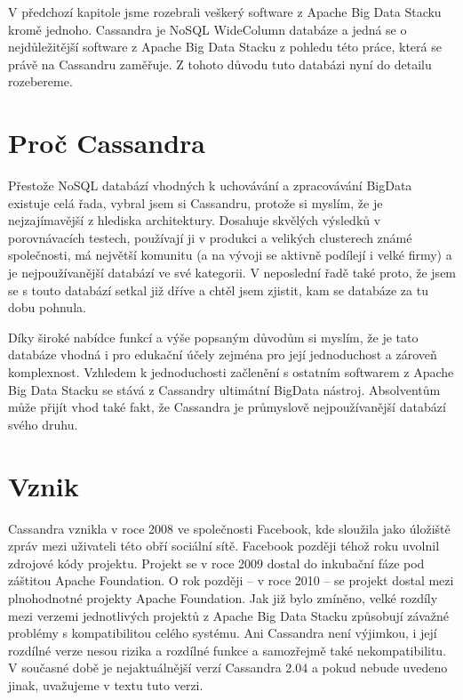 
V předchozí kapitole jsme rozebrali veškerý software z Apache Big Data Stacku kromě jednoho. Cassandra je NoSQL WideColumn databáze a jedná se o nejdůležitější software z Apache Big Data Stacku z pohledu této práce, která se právě na Cassandru zaměřuje. Z tohoto důvodu tuto databázi nyní do detailu rozebereme. 

\section{Proč Cassandra}
Přestože NoSQL databází vhodných k uchovávání a zpracovávání BigData existuje celá řada, vybral jsem si Cassandru, protože si myslím, že je nejzajímavější z hlediska architektury. Dosahuje skvělých výsledků v porovnávacích testech\cite{benchmark}, používají ji v produkci a velikých clusterech známé společnosti, má největší komunitu (a na vývoji se aktivně podílejí i velké firmy) a je nejpoužívanější databází ve své kategorii\cite{dbengines}. V neposlední řadě také proto, že jsem se s touto databází setkal již dříve a chtěl jsem zjistit, kam se databáze za tu dobu pohnula.

Díky široké nabídce funkcí a výše popsaným důvodům si myslím, že je tato databáze vhodná i pro edukační účely zejména pro její jednoduchost a zároveň komplexnost. Vzhledem k jednoduchosti začlenění s ostatním softwarem z Apache Big Data Stacku se stává z Cassandry ultimátní BigData nástroj. Absolventům může přijít vhod také fakt, že Cassandra je průmyslově nejpoužívanější databází svého druhu. %


\section{Vznik}

Cassandra vznikla v roce 2008 ve společnosti Facebook, kde sloužila jako úložiště zpráv mezi uživateli této obří sociální sítě. Facebook později téhož roku uvolnil zdrojové kódy projektu. Projekt se v roce 2009 dostal do inkubační fáze pod záštitou Apache Foundation. O rok později – v roce 2010 – se projekt dostal mezi plnohodnotné projekty Apache Foundation. Jak již bylo zmíněno, velké rozdíly mezi verzemi jednotlivých projektů z Apache Big Data Stacku způsobují závažné problémy s kompatibilitou celého systému. Ani Cassandra není výjimkou, i její rozdílné verze nesou rizika a rozdílné funkce a samozřejmě také nekompatibilitu. V současné době je nejaktuálnější verzí Cassandra 2.04 a pokud nebude uvedeno jinak, uvažujeme v textu tuto verzi. 

